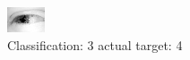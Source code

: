 \begin{figure}[h!]
\begin{center}
\includegraphics[width=0.60\columnwidth]{figures/ID2531_class_3_target_4.png}
\end{center}
\caption{ Classification: 3 actual target: 4}
\label{fig:ID2531_class_3_target_4}
\end{figure}
